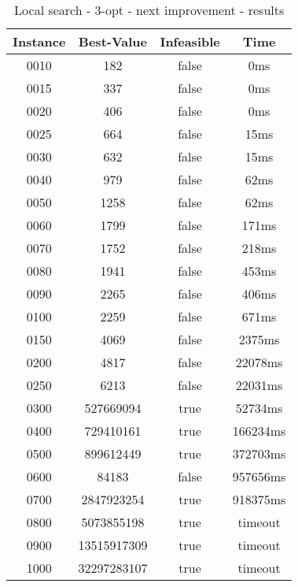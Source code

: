 \begin{table}[H]
	\centering
	\begin{tabular}{|| c | c | c | c ||} 
		\hline
		Instance & Best-Value & Infeasible & Time \\
		\hline\hline
		0010 & 182 & false & 0ms \\
		0015 & 337 & false & 0ms \\
		0020 & 406 & false & 0ms \\
		0025 & 664 & false & 15ms \\
		0030 & 632 & false & 15ms \\
		0040 & 979 & false & 62ms \\
		0050 & 1258 & false & 62ms \\
		0060 & 1799 & false & 171ms \\
		0070 & 1752 & false & 218ms \\
		0080 & 1941 & false & 453ms \\
		0090 & 2265 & false & 406ms \\
		0100 & 2259 & false & 671ms \\
		0150 & 4069 & false & 2375ms \\
		0200 & 4817 & false & 22078ms \\
		0250 & 6213 & false & 22031ms \\
		0300 & 527669094 & true & 52734ms \\
		0400 & 729410161 & true & 166234ms \\
		0500 & 899612449 & true & 372703ms \\
		0600 & 84183 & false & 957656ms \\
		0700 & 2847923254 & true & 918375ms \\
		0800 & 5073855198 & true & timeout \\
		0900 & 13515917309 & true & timeout \\
		1000 & 32297283107 & true & timeout \\
		\hline
	\end{tabular}
	\caption{Local search - 3-opt - next improvement - results}
\end{table}

